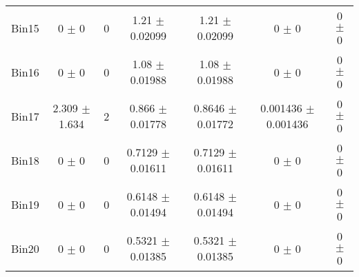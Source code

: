 \begin{tabular}{@{\extracolsep{4pt}}lcccccc@{}}
     Bin15 & 0 $\pm$ 0 & 0 & 1.21 $\pm$ 0.02099 & 1.21 $\pm$ 0.02099 & 0 $\pm$ 0 & 0 $\pm$ 0 \\ 
     Bin16 & 0 $\pm$ 0 & 0 & 1.08 $\pm$ 0.01988 & 1.08 $\pm$ 0.01988 & 0 $\pm$ 0 & 0 $\pm$ 0 \\ 
     Bin17 & 2.309 $\pm$ 1.634 & 2 & 0.866 $\pm$ 0.01778 & 0.8646 $\pm$ 0.01772 & 0.001436 $\pm$ 0.001436 & 0 $\pm$ 0 \\ 
     Bin18 & 0 $\pm$ 0 & 0 & 0.7129 $\pm$ 0.01611 & 0.7129 $\pm$ 0.01611 & 0 $\pm$ 0 & 0 $\pm$ 0 \\ 
     Bin19 & 0 $\pm$ 0 & 0 & 0.6148 $\pm$ 0.01494 & 0.6148 $\pm$ 0.01494 & 0 $\pm$ 0 & 0 $\pm$ 0 \\ 
     Bin20 & 0 $\pm$ 0 & 0 & 0.5321 $\pm$ 0.01385 & 0.5321 $\pm$ 0.01385 & 0 $\pm$ 0 & 0 $\pm$ 0 \\ 
\hline\hline
  \end{tabular}
